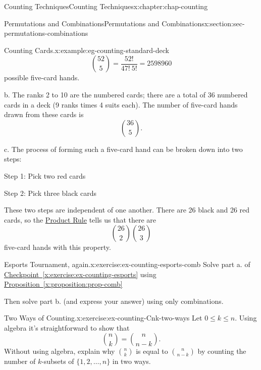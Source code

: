 \documentclass[oneside,10pt,]{book}
\newcommand{\xreffont}{\relax}
\numberwithin{equation}{section}
\begin{document}
\begin{chapterptx}{Counting Techniques}{}{Counting Techniques}{}{}{x:chapter:chap-counting}
\begin{sectionptx}{Permutations and Combinations}{}{Permutations and Combinations}{}{}{x:section:sec-permutations-combinations}
\begin{example}{Counting Cards.}{x:example:eg-counting-standard-deck}
\begin{equation*}
\binom{52}{5} = \frac{52!}{47! \ 5!} = 2598960
\end{equation*}
possible five-card hands.%
\par
b. The ranks 2 to 10 are the numbered cards; there are a total of 36 numbered cards in a deck (9 ranks times 4 suits each). The number of five-card hands drawn from these cards is%
\begin{equation*}
\binom{36}{5}\text{.}
\end{equation*}
%
\par
c. The process of forming such a five-card hand can be broken down into two steps:%
\begin{sidebyside}{2}{0.05}{0.05}{0.1}%
\begin{sbspanel}{0.4}%
Step 1: Pick two red cards%
\end{sbspanel}%
\begin{sbspanel}{0.4}%
\par
Step 2: Pick three black cards%
\end{sbspanel}%
\end{sidebyside}%
\par
These two steps are independent of one another. There are 26 black and 26 red cards, so the \hyperref[x:principle:prin-prod-rule]{Product Rule} tells us that there are%
\begin{equation*}
\binom{26}{2}\binom{26}{3}
\end{equation*}
five-card hands with this property.%
\end{example}
\begin{inlineexercise}{Esports Tournament, again.}{x:exercise:ex-counting-esports-comb}%
Solve part a. of \hyperref[x:exercise:ex-counting-esports]{Checkpoint~{\xreffont\ref{x:exercise:ex-counting-esports}}} using \hyperref[x:proposition:prop-comb]{Proposition~{\xreffont\ref{x:proposition:prop-comb}}}%
\par
Then solve part b. (and express your answer) using only combinations.%
\end{inlineexercise}%
\begin{inlineexercise}{Two Ways of Counting.}{x:exercise:ex-counting-Cnk-two-ways}%
Let \(0 \leq k \leq n\). Using algebra it's straightforward to show that%
\begin{equation*}
\binom{n}{k} = \binom{n}{n-k}\text{.}
\end{equation*}
Without using algebra, explain why \(\displaystyle\binom{n}{k}\) is equal to \(\displaystyle\binom{n}{n-k}\) by counting the number of \(k\)-subsets of \(\{1,2,\ldots,n\}\) in two ways.%

\end{inlineexercise}
\end{sectionptx}
\end{chapterptx}
\end{document}
